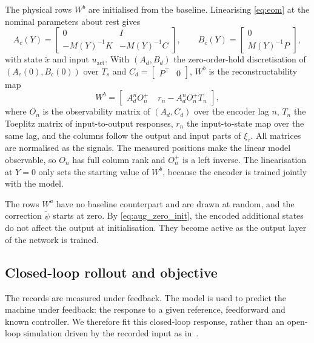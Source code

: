 The physical rows $W^b$ are initialised from the baseline.
Linearising \eqref{eq:eom} at the nominal parameters about rest gives
\begin{equation}
 A_c(Y)=\begin{bmatrix}0 & I\\ -M(Y)^{-1}K & -M(Y)^{-1}C\end{bmatrix},\qquad
 B_c(Y)=\begin{bmatrix}0\\ M(Y)^{-1}P\end{bmatrix},
 \label{eq:aug_lin}
\end{equation}
with state $\tilde x$ and input $u_{\mathrm{act}}$.
With $(A_d,B_d)$ the zero-order-hold discretisation of $(A_c(0),B_c(0))$
over $T_s$ and $C_d=\begin{bmatrix}P^\top & 0\end{bmatrix}$, $W^b$ is the
reconstructability map~\cite[Eqs.~(16), (17)]{hoekstra2026encoder}
\begin{equation}
 W^b=\begin{bmatrix}
  A_d^nO_n^{+} & \;r_n-A_d^nO_n^{+}T_n
 \end{bmatrix},
 \label{eq:aug_wb}
\end{equation}
where $O_n$ is the observability matrix of $(A_d,C_d)$ over the encoder lag
$n$, $T_n$ the Toeplitz matrix of input-to-output responses, $r_n$ the
input-to-state map over the same lag, and the columns follow the output and
input parts of $\xi_\tau$.
All matrices are normalised as the signals.
The measured positions make the linear model observable, so $O_n$ has full
column rank and $O_n^{+}$ is a left inverse.
The linearisation at $Y=0$ only sets the starting value of $W^b$, because
the encoder is trained jointly with the model.

The rows $W^a$ have no baseline counterpart and are drawn at random, and
the correction $\tilde\psi$ starts at zero.
By \eqref{eq:aug_zero_init}, the encoded additional states do not affect the
output at initialisation.
They become active as the output layer of the network is trained.

\subsection{Closed-loop rollout and objective}\label{sec:aug_closed_loop}
The records are measured under feedback.
The model is used to predict the machine under feedback: the response to a given reference, feedforward and
known controller.
We therefore fit this closed-loop response, rather than an open-loop
simulation driven by the recorded input as
in~\cite[Eq.~(22)]{hoekstra2026lfr}.

